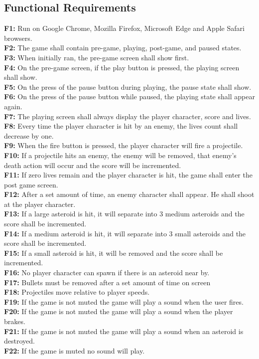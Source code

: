 \documentclass[12pt, titlepage]{article}
\begin{document}
\subsection{Functional Requirements}
  \textbf{F1:} Run on Google Chrome, Mozilla Firefox, Microsoft Edge and Apple Safari browsers.\\
  \textbf{F2:} The game shall contain pre-game, playing, post-game, and paused states.\\
  \textbf{F3:} When initially ran, the pre-game screen shall show first.\\
  \textbf{F4:} On the pre-game screen, if the play button is pressed, the playing screen shall show.\\
  \textbf{F5:} On the press of the pause button during playing, the pause state shall show.\\
  \textbf{F6:} On the press of the pause button while paused, the playing state shall appear again.\\
  \textbf{F7:} The playing screen shall always display the player character, score and lives.\\
  \textbf{F8:} Every time the player character is hit by an enemy, the lives count shall decrease by one.\\
  \textbf{F9:} When the fire button is pressed, the player character will fire a projectile.\\
  \textbf{F10:} If a projectile hits an enemy, the enemy will be removed, that enemy's death action will occur and the score will be incremented.\\
  \textbf{F11:} If zero lives remain and the player character is hit, the game shall enter the post game screen.\\
  \textbf{F12:} After a set amount of time, an enemy character shall appear. He shall shoot at the player character.\\
  \textbf{F13:} If a large asteroid is hit, it will separate into 3 medium asteroids and the score shall be incremented.\\
  \textbf{F14:} If a medium asteroid is hit, it will separate into 3 small asteroids and the score shall be incremented.\\
  \textbf{F15:} If a small asteroid is hit, it will be removed and the score shall be incremented.\\
  \textbf{F16:} No player character can spawn if there is an asteroid near by.\\
  \textbf{F17:} Bullets must be removed after a set amount of time on screen\\
  \textbf{F18:} Projectiles move relative to player speeds.\\
  \textbf{F19:} If the game is not muted the game will play a sound when the user fires.\\
  \textbf{F20:} If the game is not muted the game will play a sound when the player brakes.\\
  \textbf{F21:} If the game is not muted the game will play a sound when an asteroid is destroyed.\\
  \textbf{F22:} If the game is muted no sound will play.\\
\end{document}
